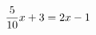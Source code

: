 \documentclass[preview]{standalone}
\begin{document}
\begin{align*}
\special{dvisvgm:raw <g id='unique000'>}\frac{5}{10}x+3=2x-1\special{dvisvgm:raw </g>}
\end{align*}
\end{document}
